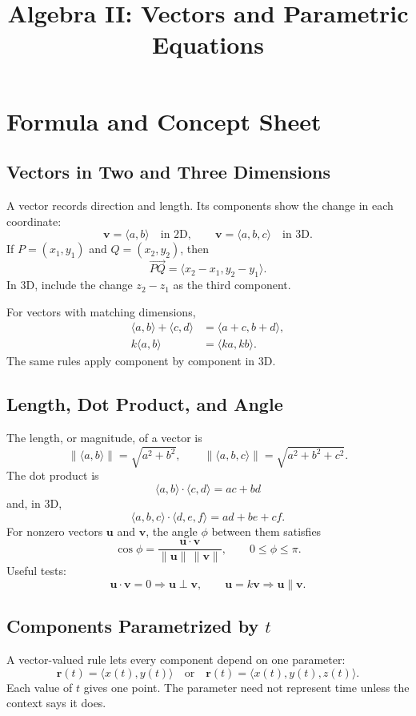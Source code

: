\documentclass[12pt]{article}
\title{Algebra II: Vectors and Parametric Equations}
\author{}
\date{}
\begin{document}
\maketitle

\section*{Formula and Concept Sheet}

\subsection*{Vectors in Two and Three Dimensions}
A vector records direction and length. Its components show the change in each coordinate:
\[
  \mathbf{v}=\langle a,b\rangle \quad\text{in 2D},
  \qquad
  \mathbf{v}=\langle a,b,c\rangle \quad\text{in 3D}.
\]
If $P=(x_1,y_1)$ and $Q=(x_2,y_2)$, then
\[
  \overrightarrow{PQ}=\langle x_2-x_1,y_2-y_1\rangle.
\]
In 3D, include the change $z_2-z_1$ as the third component.

For vectors with matching dimensions,
\[
\begin{aligned}
  \langle a,b\rangle+\langle c,d\rangle&=\langle a+c,b+d\rangle,\\
  k\langle a,b\rangle&=\langle ka,kb\rangle.
\end{aligned}
\]
The same rules apply component by component in 3D.

\subsection*{Length, Dot Product, and Angle}
The length, or magnitude, of a vector is
\[
  \|\langle a,b\rangle\|=\sqrt{a^2+b^2},
  \qquad
  \|\langle a,b,c\rangle\|=\sqrt{a^2+b^2+c^2}.
\]
The dot product is
\[
  \langle a,b\rangle\cdot\langle c,d\rangle=ac+bd
\]
and, in 3D,
\[
  \langle a,b,c\rangle\cdot\langle d,e,f\rangle=ad+be+cf.
\]
For nonzero vectors $\mathbf{u}$ and $\mathbf{v}$, the angle $\phi$ between them satisfies
\[
  \cos\phi=\frac{\mathbf{u}\cdot\mathbf{v}}
  {\|\mathbf{u}\|\,\|\mathbf{v}\|},
  \qquad 0\le\phi\le\pi.
\]
Useful tests:
\[
  \mathbf{u}\cdot\mathbf{v}=0 \Longrightarrow \mathbf{u}\perp\mathbf{v},
  \qquad
  \mathbf{u}=k\mathbf{v} \Longrightarrow \mathbf{u}\parallel\mathbf{v}.
\]

\subsection*{Components Parametrized by $t$}
A vector-valued rule lets every component depend on one parameter:
\[
  \mathbf{r}(t)=\langle x(t),y(t)\rangle
  \quad\text{or}\quad
  \mathbf{r}(t)=\langle x(t),y(t),z(t)\rangle.
\]
Each value of $t$ gives one point. The parameter need not represent time unless the context says it does.
\end{document}

